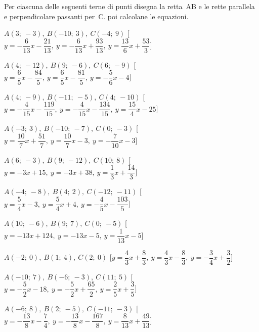\begin{esercizio}\label{ese:}
 Per ciascuna delle seguenti terne di 
punti disegna la retta~AB e le rette parallela e perpendicolare passanti 
per~C. poi calcolane le equazioni.
 \begin{enumeratea}
  \item  \(A(3;~-3),~B(-10;~3),~C(-4;~9)\) \hfill 
   [\(y = -\dfrac{6}{13} x -\dfrac{21}{13},~y = -\dfrac{6}{13} x 
+\dfrac{93}{13},~y = \dfrac{13}{6} x +\dfrac{53}{3}\)]
  \item  \(A(4;~-12),~B(9;~-6),~C(6;~-9)\) \hfill 
   [\(y = \dfrac{6}{5} x -\dfrac{84}{5},~y = \dfrac{6}{5} x -\dfrac{81}{5},~y = 
-\dfrac{5}{6} x -4\)]
  \item  \(A(4;~-9),~B(-11;~-5),~C(4;~-10)\) \hfill 
   [\(y = -\dfrac{4}{15} x -\dfrac{119}{15},~y = -\dfrac{4}{15} x 
-\dfrac{134}{15},~y = \dfrac{15}{4} x -25\)]
  \item  \(A(-3;~3),~B(-10;~-7),~C(0;~-3)\) \hfill 
   [\(y = \dfrac{10}{7} x +\dfrac{51}{7},~y = \dfrac{10}{7} x -3,~y = 
-\dfrac{7}{10} x -3\)]
  \item  \(A(6;~-3),~B(9;~-12),~C(10;~8)\) \hfill 
   [\(y = -3 x +15,~y = -3 x +38,~y = \dfrac{1}{3} x +\dfrac{14}{3}\)]
  \item  \(A(-4;~-8),~B(4;~2),~C(-12;~-11)\) \hfill 
   [\(y = \dfrac{5}{4} x -3,~y = \dfrac{5}{4} x +4,~y = -\dfrac{4}{5} x 
-\dfrac{103}{5}\)]
  \item  \(A(10;~-6),~B(9;~7),~C(0;~-5)\) \hfill 
   [\(y = -13 x +124,~y = -13 x -5,~y = \dfrac{1}{13} x -5\)]
  \item  \(A(-2;~0),~B(1;~4),~C(2;~0)\) \hfill 
   [\(y = \dfrac{4}{3} x +\dfrac{8}{3},~y = \dfrac{4}{3} x -\dfrac{8}{3},~y = 
-\dfrac{3}{4} x +\dfrac{3}{2}\)]
  \item  \(A(-10;~7),~B(-6;~-3),~C(11;~5)\) \hfill 
   [\(y = -\dfrac{5}{2} x -18,~y = -\dfrac{5}{2} x +\dfrac{65}{2},~y = 
\dfrac{2}{5} x +\dfrac{3}{5}\)]
  \item  \(A(-6;~8),~B(2;~-5),~C(-11;~-3)\) \hfill 
   [\(y = -\dfrac{13}{8} x -\dfrac{7}{4},~y = -\dfrac{13}{8} x -\dfrac{167}{8},~y 
= \dfrac{8}{13} x +\dfrac{49}{13}\)]

\end{enumeratea}
\end{esercizio}
